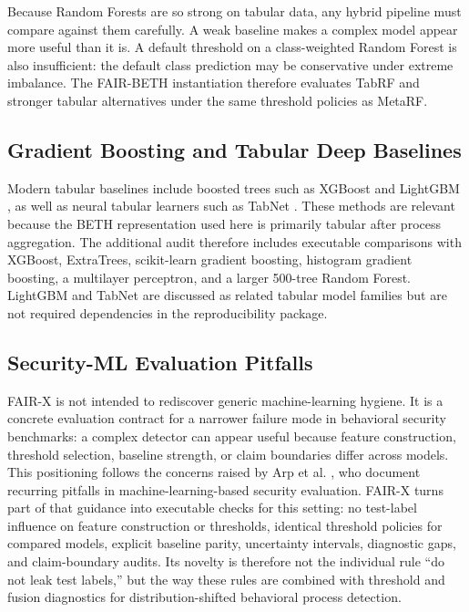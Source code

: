 \documentclass[10pt,journal,compsoc]{IEEEtran}
\begin{document}
Because Random Forests are so strong on tabular data, any hybrid pipeline must compare against them carefully. A weak baseline makes a complex model appear more useful than it is. A default threshold on a class-weighted Random Forest is also insufficient: the default class prediction may be conservative under extreme imbalance. The FAIR-BETH instantiation therefore evaluates TabRF and stronger tabular alternatives under the same threshold policies as MetaRF.

\subsection{Gradient Boosting and Tabular Deep Baselines}

Modern tabular baselines include boosted trees such as XGBoost \cite{chen2016xgboost} and LightGBM \cite{ke2017lightgbm}, as well as neural tabular learners such as TabNet \cite{arik2021tabnet}. These methods are relevant because the BETH representation used here is primarily tabular after process aggregation. The additional audit therefore includes executable comparisons with XGBoost, ExtraTrees, scikit-learn gradient boosting, histogram gradient boosting, a multilayer perceptron, and a larger 500-tree Random Forest. LightGBM and TabNet are discussed as related tabular model families but are not required dependencies in the reproducibility package.

\subsection{Security-ML Evaluation Pitfalls}

FAIR-X is not intended to rediscover generic machine-learning hygiene. It is a concrete evaluation contract for a narrower failure mode in behavioral security benchmarks: a complex detector can appear useful because feature construction, threshold selection, baseline strength, or claim boundaries differ across models. This positioning follows the concerns raised by Arp et al. \cite{arp2022}, who document recurring pitfalls in machine-learning-based security evaluation. FAIR-X turns part of that guidance into executable checks for this setting: no test-label influence on feature construction or thresholds, identical threshold policies for compared models, explicit baseline parity, uncertainty intervals, diagnostic gaps, and claim-boundary audits. Its novelty is therefore not the individual rule ``do not leak test labels,'' but the way these rules are combined with threshold and fusion diagnostics for distribution-shifted behavioral process detection.
\end{document}
